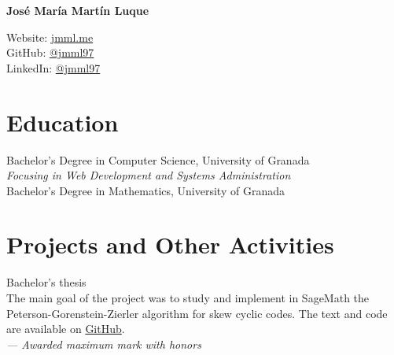 \documentclass[11pt]{article} %
\begin{document}
\pagestyle{fancy}


{\LARGE\bfseries José María Martín Luque}
\bigskip\bigskip\medskip

\ifdefined\emailphone
  
\fi
Website: \href{https://jmml.me}{jmml.me}\\
GitHub: \href{https://github.com/jmml97}{@jmml97}\\
LinkedIn: \href{https://linkedin.com/in/jmml97}{@jmml97}\\


\section*{Education}

 Bachelor's Degree in Computer Science, University of Granada\\
	{\color{gray}\itshape Focusing in Web Development and Systems Administration}\\

 Bachelor's Degree in Mathematics, University of Granada\\


\section*{Projects and Other Activities}

 Bachelor's thesis\\
{\color{gray}The main goal of the project was to study and implement in SageMath the Peterson-Gorenstein-Zierler algorithm for skew cyclic codes. The text and code are available on \href{https://github.com/jmml97/tfg}{GitHub}.}\\
{\color{gray}\itshape — Awarded maximum mark with honors}\\
\end{document}
